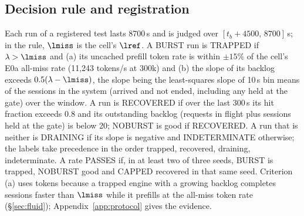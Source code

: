 \subsection{Decision rule and registration}\label{sec:prereg}
Each run of a registered test lasts 8700\,s and is judged over $[t_b+4500,\,8700]$\,s; in the rule, $\lmiss$ is the cell's $\lref$. A BURST run is TRAPPED if $\lambda>\lmiss$ and (a) its uncached prefill token rate is within $\pm15\%$ of the cell's E0a all-miss rate (11,243 tokens/s at 300k) and (b) the slope of its backlog exceeds $0.5(\lambda-\lmiss)$, the slope being the least-squares slope of 10\,s bin means of the sessions in the system (arrived and not ended, including any held at the gate) over the window. A run is RECOVERED if over the last 300\,s its hit fraction exceeds 0.8 and its outstanding backlog (requests in flight plus sessions held at the gate) is below 20; NOBURST is good if RECOVERED. A run that is neither is DRAINING if its slope is negative and INDETERMINATE otherwise; the labels take precedence in the order trapped, recovered, draining, indeterminate. A rate PASSES if, in at least two of three seeds, BURST is trapped, NOBURST good and CAPPED recovered in that same seed. Criterion (a) uses tokens because a trapped engine with a growing backlog completes sessions faster than $\lmiss$ while it prefills at the all-miss token rate (\S\ref{sec:fluid}); Appendix~\ref{app:protocol} gives the evidence.

